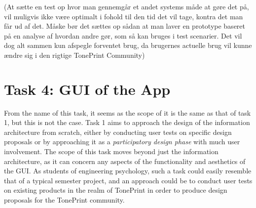 (At sætte en test op hvor man gennemgår et andet systems måde at gøre det på, vil muligvis ikke være optimalt i fohold til den tid det vil tage, kontra det man får ud af det. Måske bør det sættes op sådan at man laver en prototype baseret på en analyse af hvordan andre gør, som så kan bruges i test scenarier. Det vil dog alt sammen kun afspegle forventet brug, da brugernes actuelle brug vil kunne ændre sig i den rigtige TonePrint Community)


\section{Task 4: GUI of the App}
\label{Task4}
From the name of this task, it seems as the scope of it is the same as that of task 1, but this is not the case. Task 1 aims to approach the design of the information architecture from scratch, either by conducting user tests on specific design proposals or by approaching it as a \textit{participatory design phase} with much user involvement. The scope of this task moves beyond just the information architecture, as it can concern any aspects of the functionality and aesthetics of the GUI. As students of engineering psychology, such a task could easily resemble that of a typical semester project, and an approach could be to conduct user tests on existing products in the realm of TonePrint in order to produce design proposals for the TonePrint community.\\

